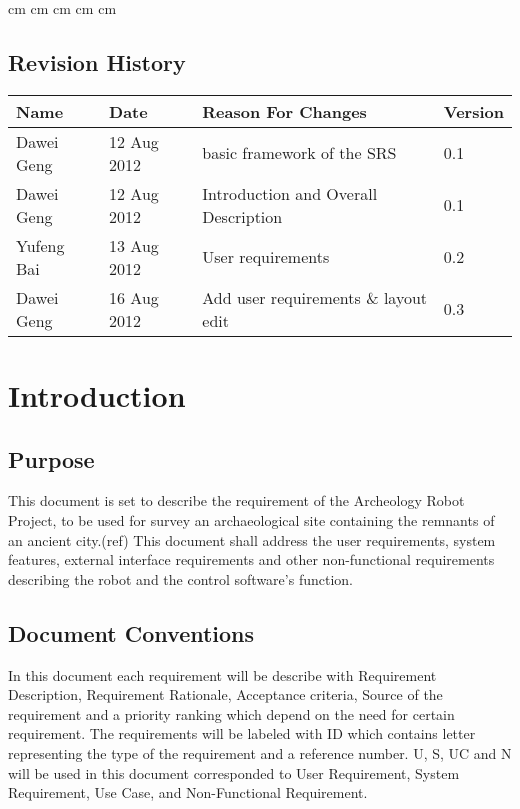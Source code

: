 \documentclass[11pt, a4paper]{report}
\begin{document}
 cm
 cm
 cm
 cm
 cm

\tableofcontents






\clearpage
\section*{Revision History}
\begin{tabular}{| l | l | l | l | }
\hline
Name      		&	Date        	&	Reason For Changes                  	&	Version     	\\ \hline
Dawei Geng      & 	12 Aug 2012    	& 	basic framework of the SRS     			&	0.1             \\ \hline
Dawei Geng      &	12 Aug 2012    	& 	Introduction and Overall Description    &	0.1             \\ \hline
Yufeng Bai  	&	13 Aug 2012 	&	User requirements 						&	0.2  			\\ \hline
Dawei Geng		&	16 Aug 2012		&	Add user requirements \& layout edit	&	0.3 			\\ \hline





\end{tabular}
\clearpage


\chapter{Introduction}

\section{Purpose}
This document is set to describe the requirement of the Archeology Robot Project, to be used for survey an archaeological site containing the remnants of an ancient city.(ref) This document shall address the user requirements, system features, external interface requirements and other non-functional requirements describing the robot and the control software's function. 


\section{Document Conventions}
In this document each requirement will be describe with Requirement Description, Requirement Rationale, Acceptance criteria, Source of the requirement and a priority ranking which depend on the need for certain requirement. 
The requirements will be labeled with ID which contains letter representing the type of the requirement and a reference number. U, S, UC and N will be used in this document corresponded to User Requirement, System Requirement, Use Case, and Non-Functional Requirement. 
\end{document}
